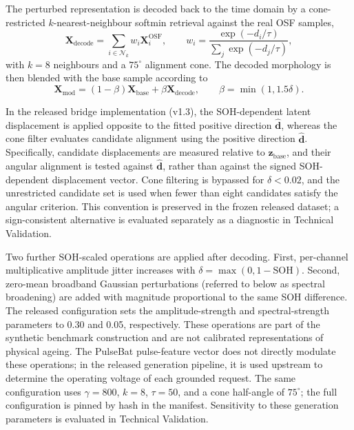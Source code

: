 \documentclass[11pt]{article}
\begin{document}
The perturbed representation is decoded back to the time domain by a
cone-restricted $k$-nearest-neighbour softmin retrieval against the real
OSF samples,
\begin{equation}
\mathbf{X}_{\mathrm{decode}} =
\sum_{i\in\mathcal{N}_k}w_i\mathbf{X}^{\mathrm{OSF}}_i,
\qquad
w_i =
\frac{\exp(-d_i/\tau)}
{\sum_j\exp(-d_j/\tau)},
\end{equation}
with $k=8$ neighbours and a $75^\circ$ alignment cone. The decoded
morphology is then blended with the base sample according to
\begin{equation}
\mathbf{X}_{\mathrm{mod}} =
(1-\beta)\mathbf{X}_{\mathrm{base}}
+\beta\mathbf{X}_{\mathrm{decode}},
\qquad
\beta=\min(1,1.5\delta).
\end{equation}

In the released bridge implementation (v1.3), the
SOH-dependent latent displacement is applied opposite
to the fitted positive direction $\hat{\mathbf{d}}$,
whereas the cone filter evaluates candidate alignment
using the positive direction $\hat{\mathbf{d}}$.
Specifically, candidate displacements are measured
relative to $\mathbf{z}_{\mathrm{base}}$, and their
angular alignment is tested against
$\hat{\mathbf{d}}$, rather than against the signed
SOH-dependent displacement vector. Cone filtering is
bypassed for $\delta < 0.02$, and the unrestricted
candidate set is used when fewer than eight candidates
satisfy the angular criterion. This convention is
preserved in the frozen released dataset; a
sign-consistent alternative is evaluated separately
as a diagnostic in Technical Validation.

Two further SOH-scaled operations are applied after decoding. First, per-channel multiplicative amplitude jitter increases with \(\delta=\max(0,1-\mathrm{SOH})\). Second, zero-mean broadband Gaussian perturbations (referred to below as spectral broadening) are added with magnitude proportional to the same SOH difference. The released configuration sets the amplitude-strength and spectral-strength parameters to 0.30 and 0.05, respectively. These operations are part of the synthetic benchmark construction and are not calibrated representations of physical ageing. The PulseBat pulse-feature vector does not directly modulate these operations; in the released generation pipeline, it is used upstream to determine the operating voltage of each grounded request. The same configuration uses \(\gamma=800\), \(k=8\), \(\tau=50\), and a cone half-angle of \(75^\circ\); the full configuration is pinned by hash in the manifest. Sensitivity to these generation parameters is evaluated in Technical Validation.
\end{document}
